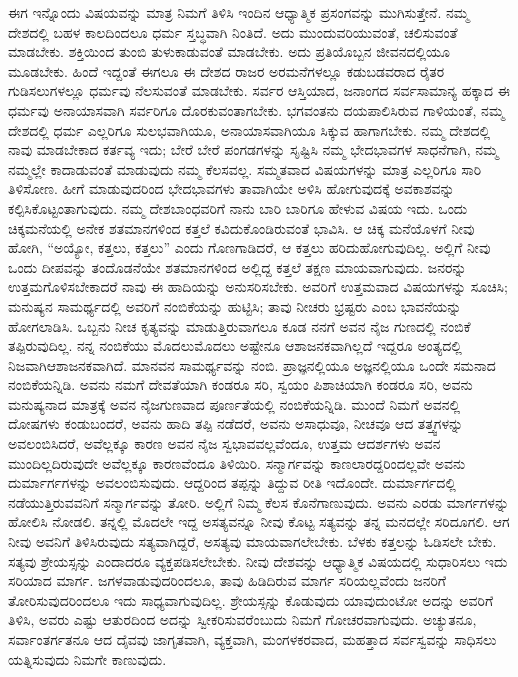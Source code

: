 ಈಗ ಇನ್ನೊಂದು ವಿಷಯವನ್ನು ಮಾತ್ರ ನಿಮಗೆ ತಿಳಿಸಿ ಇಂದಿನ ಆಧ್ಯಾತ್ಮಿಕ ಪ್ರಸಂಗವನ್ನು ಮುಗಿಸುತ್ತೇನೆ. ನಮ್ಮ ದೇಶದಲ್ಲಿ ಬಹಳ ಕಾಲದಿಂದಲೂ ಧರ್ಮ ಸ್ತಬ್ಧವಾಗಿ ನಿಂತಿದೆ. ಅದು ಮುಂದುವರಿಯುವಂತೆ, ಚಲಿಸುವಂತೆ ಮಾಡಬೇಕು. ಶಕ್ತಿಯಿಂದ ತುಂಬಿ ತುಳುಕಾಡುವಂತೆ ಮಾಡಬೇಕು. ಅದು ಪ್ರತಿಯೊಬ್ಬನ ಜೀವನದಲ್ಲಿಯೂ ಮೂಡಬೇಕು. ಹಿಂದೆ ಇದ್ದಂತೆ ಈಗಲೂ ಈ ದೇಶದ ರಾಜರ ಅರಮನೆಗಳಲ್ಲೂ ಕಡುಬಡವರಾದ ರೈತರ ಗುಡಿಸಲುಗಳಲ್ಲೂ ಧರ್ಮವು ನೆಲಸುವಂತೆ ಮಾಡಬೇಕು. ಸರ್ವರ ಆಸ್ತಿಯಾದ, ಜನಾಂಗದ ಸರ್ವಸಾಮಾನ್ಯ ಹಕ್ಕಾದ ಈ ಧರ್ಮವು ಅನಾಯಾಸವಾಗಿ ಸರ್ವರಿಗೂ ದೊರಕುವಂತಾಗಬೇಕು. ಭಗವಂತನು ದಯಪಾಲಿಸಿರುವ ಗಾಳಿಯಂತೆ, ನಮ್ಮ ದೇಶದಲ್ಲಿ ಧರ್ಮ ಎಲ್ಲರಿಗೂ ಸುಲಭವಾಗಿಯೂ, ಅನಾಯಾಸವಾಗಿಯೂ ಸಿಕ್ಕುವ ಹಾಗಾಗಬೇಕು. ನಮ್ಮ ದೇಶದಲ್ಲಿ ನಾವು ಮಾಡಬೇಕಾದ ಕರ್ತವ್ಯ ಇದು; ಬೇರೆ ಬೇರೆ ಪಂಗಡಗಳನ್ನು ಸೃಷ್ಟಿಸಿ ನಮ್ಮ ಭೇದಭಾವಗಳ ಸಾಧನೆಗಾಗಿ, ನಮ್ಮ ನಮ್ಮಲ್ಲೇ ಕಾದಾಡುವಂತೆ ಮಾಡುವುದು ನಮ್ಮ ಕೆಲಸವಲ್ಲ. ಸಮ್ಮತವಾದ ವಿಷಯಗಳನ್ನು ಮಾತ್ರ ಎಲ್ಲರಿಗೂ ಸಾರಿ ತಿಳಿಸೋಣ. ಹೀಗೆ ಮಾಡುವುದರಿಂದ ಭೇದಭಾವಗಳು ತಾವಾಗಿಯೇ ಅಳಿಸಿ ಹೋಗುವುದಕ್ಕೆ ಅವಕಾಶವನ್ನು ಕಲ್ಪಿಸಿಕೊಟ್ಟಂತಾಗುವುದು. ನಮ್ಮ ದೇಶಬಾಂಧವರಿಗೆ ನಾನು ಬಾರಿ ಬಾರಿಗೂ ಹೇಳುವ ವಿಷಯ ಇದು. ಒಂದು ಚಿಕ್ಕಮನೆಯಲ್ಲಿ ಅನೇಕ ಶತಮಾನಗಳಿಂದ ಕತ್ತಲೆ ಕವಿದುಕೊಂಡಿರುವಂತೆ ಭಾವಿಸಿ. ಆ ಚಿಕ್ಕ ಮನೆಯೊಳಗೆ ನೀವು ಹೋಗಿ, “ಅಯ್ಯೋ, ಕತ್ತಲು, ಕತ್ತಲು” ಎಂದು ಗೊಣಗಾಡಿದರೆ, ಆ ಕತ್ತಲು ಹರಿದುಹೋಗುವುದಿಲ್ಲ. ಅಲ್ಲಿಗೆ ನೀವು ಒಂದು ದೀಪವನ್ನು ತಂದೊಡನೆಯೇ ಶತಮಾನಗಳಿಂದ ಅಲ್ಲಿದ್ದ ಕತ್ತಲೆ ತಕ್ಷಣ ಮಾಯವಾಗುವುದು. ಜನರನ್ನು ಉತ್ತಮಗೊಳಿಸಬೇಕಾದರೆ ನಾವು ಈ ಹಾದಿಯನ್ನು ಅನುಸರಿಸಬೇಕು. ಅವರಿಗೆ ಉತ್ತಮವಾದ ವಿಷಯಗಳನ್ನು ಸೂಚಿಸಿ; ಮನುಷ್ಯನ ಸಾಮರ್ಥ್ಯದಲ್ಲಿ ಅವರಿಗೆ ನಂಬಿಕೆಯನ್ನು ಹುಟ್ಟಿಸಿ; ತಾವು ನೀಚರು ಭ್ರಷ್ಟರು ಎಂಬ ಭಾವನೆಯನ್ನು ಹೋಗಲಾಡಿಸಿ. ಒಬ್ಬನು ನೀಚ ಕೃತ್ಯವನ್ನು ಮಾಡುತ್ತಿರುವಾಗಲೂ ಕೂಡ ನನಗೆ ಅವನ ನೈಜ ಗುಣದಲ್ಲಿ ನಂಬಿಕೆ ತಪ್ಪಿರುವುದಿಲ್ಲ. ನನ್ನ ನಂಬಿಕೆಯು ಮೊದಲು\break ಮೊದಲು ಅಷ್ಟೇನೂ ಆಶಾಜನಕವಾಗಿಲ್ಲದೆ ಇದ್ದರೂ ಅಂತ್ಯದಲ್ಲಿ ನಿಜವಾಗಿ\break ಆಶಾಜನಕವಾಗಿದೆ. ಮಾನವನ ಸಾಮರ್ಥ್ಯವನ್ನು ನಂಬಿ. ಪ್ರಾಜ್ಞನಲ್ಲಿಯೂ ಅಜ್ಞನಲ್ಲಿಯೂ ಒಂದೇ ಸಮನಾದ ನಂಬಿಕೆಯನ್ನಿಡಿ. ಅವನು ನಮಗೆ ದೇವತೆಯಾಗಿ ಕಂಡರೂ ಸರಿ, ಸ್ವಯಂ ಪಿಶಾಚಿಯಾಗಿ ಕಂಡರೂ ಸರಿ, ಅವನು ಮನುಷ್ಯ\break ನಾದ ಮಾತ್ರಕ್ಕೆ ಅವನ ನೈಜಗುಣವಾದ ಪೂರ್ಣತೆಯಲ್ಲಿ ನಂಬಿಕೆಯನ್ನಿಡಿ. ಮುಂದೆ ನಿಮಗೆ ಅವನಲ್ಲಿ ದೋಷಗಳು ಕಂಡುಬಂದರೆ, ಅವನು ಹಾದಿ ತಪ್ಪಿ ನಡೆದರೆ, ಅವನು ಅಸಾಧುವೂ, ನೀಚವೂ ಆದ ತತ್ತ್ವಗಳನ್ನು ಅವಲಂಬಿಸಿದರೆ, ಅವೆಲ್ಲಕ್ಕೂ ಕಾರಣ ಅವನ ನೈಜ ಸ್ವಭಾವವಲ್ಲವೆಂದೂ, ಉತ್ತಮ ಆದರ್ಶಗಳು ಅವನ ಮುಂದಿಲ್ಲದಿರುವುದೇ ಅವೆಲ್ಲಕ್ಕೂ ಕಾರಣವೆಂದೂ ತಿಳಿಯಿರಿ. ಸನ್ಮಾರ್ಗವನ್ನು ಕಾಣಲಾರದ್ದರಿಂದಲ್ಲವೇ ಅವನು ದುರ್ಮಾರ್ಗಗಳನ್ನು ಅವಲಂಬಿಸುವುದು. ಆದ್ದರಿಂದ ತಪ್ಪನ್ನು ತಿದ್ದುವ ರೀತಿ ಇದೊಂದೇ. ದುರ್ಮಾರ್ಗದಲ್ಲಿ ನಡೆಯುತ್ತಿರುವವನಿಗೆ ಸನ್ಮಾರ್ಗವನ್ನು ತೋರಿ. ಅಲ್ಲಿಗೆ ನಿಮ್ಮ ಕೆಲಸ ಕೊನೆಗಾಣುವುದು. ಅವನು ಎರಡು ಮಾರ್ಗಗಳನ್ನು ಹೋಲಿಸಿ ನೋಡಲಿ. ತನ್ನಲ್ಲಿ ಮೊದಲೇ ಇದ್ದ ಅಸತ್ಯವನ್ನೂ ನೀವು ಕೊಟ್ಟ ಸತ್ಯವನ್ನು ತನ್ನ ಮನದಲ್ಲೇ ಸರಿ\-ದೂಗಲಿ. ಆಗ ನೀವು ಅವನಿಗೆ ತಿಳಿಸಿರುವುದು ಸತ್ಯವಾಗಿದ್ದರೆ, ಅಸತ್ಯವು ಮಾಯವಾಗಲೇಬೇಕು. ಬೆಳಕು ಕತ್ತಲನ್ನು ಓಡಿಸಲೇ ಬೇಕು. ಸತ್ಯವು ಶ್ರೇಯಸ್ಸನ್ನು ಎಂದಾದರೂ ವ್ಯಕ್ತಪಡಿಸಲೇಬೇಕು. ನೀವು ದೇಶವನ್ನು ಆಧ್ಯಾತ್ಮಿಕ ವಿಷಯದಲ್ಲಿ ಸುಧಾರಿಸಲು ಇದು ಸರಿಯಾದ ಮಾರ್ಗ. ಜಗಳವಾಡುವುದರಿಂದಲೂ, ತಾವು ಹಿಡಿದಿರುವ ಮಾರ್ಗ ಸರಿಯಲ್ಲವೆಂದು ಜನರಿಗೆ ತೋರಿಸುವುದರಿಂದಲೂ ಇದು ಸಾಧ್ಯವಾಗುವುದಿಲ್ಲ. ಶ್ರೇಯಸ್ಸನ್ನು ಕೊಡುವುದು ಯಾವುದುಂಟೋ ಅದನ್ನು ಅವರಿಗೆ ತಿಳಿಸಿ, ಅವರು ಎಷ್ಟು ಆತುರದಿಂದ ಅದನ್ನು ಸ್ವೀಕರಿಸುವರೆಂಬುದು ನಿಮಗೆ ಗೋಚರವಾಗುವುದು. ಅಚ್ಯುತನೂ, ಸರ್ವಾಂತರ್ಗತನೂ ಆದ ದೈವವು ಜಾಗೃತವಾಗಿ, ವ್ಯಕ್ತವಾಗಿ, ಮಂಗಳಕರವಾದ, ಮಹತ್ತಾದ ಸರ್ವಸ್ವವನ್ನು ಸಾಧಿಸಲು ಯತ್ನಿಸುವುದು ನಿಮಗೇ ಕಾಣುವುದು.

